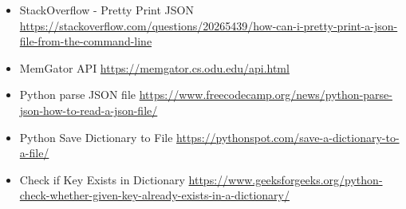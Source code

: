 \documentclass[12pt]{article}
\begin{document}
\begin{itemize}
    \item{StackOverflow - Pretty Print JSON} \url{https://stackoverflow.com/questions/20265439/how-can-i-pretty-print-a-json-file-from-the-command-line}
    \item{MemGator API} \url{https://memgator.cs.odu.edu/api.html}
    \item{Python parse JSON file} \url{https://www.freecodecamp.org/news/python-parse-json-how-to-read-a-json-file/}
    \item{Python Save Dictionary to File} \url{https://pythonspot.com/save-a-dictionary-to-a-file/}
    \item{Check if Key Exists in Dictionary} \url{https://www.geeksforgeeks.org/python-check-whether-given-key-already-exists-in-a-dictionary/}
\end{itemize}
\end{document}
